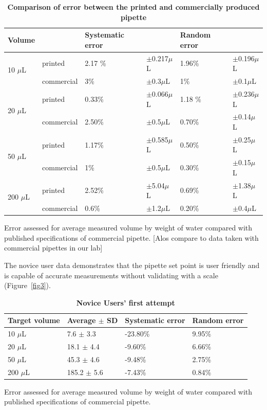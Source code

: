 \documentclass[10pt,letterpaper]{article}
\begin{document}
\begin{table}[]
\centering
\caption{
\bf{Comparison of error between the printed and commercially produced pipette}}
\begin{tabular}{llllll}
                  Volume &   & Systematic error &  & Random error & \\
                  \hline
\multirow{2}{*}{10 $\mu$L} & printed & 2.17 \% & $\pm$0.217$\mu$L  & 1.96\% & $\pm$0.196$\mu$L   \\
                  & commercial & 3\% & $\pm$0.3$\mu$L  & 1\% & $\pm$0.1$\mu$L  \\
                  \hline
\multirow{2}{*}{20 $\mu$L} & printed  & 0.33\% & $\pm$0.066$\mu$L & 1.18 \% & $\pm$0.236$\mu$L \\
                  & commercial & 2.50\% & $\pm$0.5$\mu$L & 0.70\% & $\pm$0.14$\mu$L \\
                  \hline
\multirow{2}{*}{50 $\mu$L} & printed & 1.17\% & $\pm$0.585$\mu$L & 0.50\% & $\pm$0.25$\mu$L \\
                  & commercial & 1\% & $\pm$0.5$\mu$L & 0.30\% & $\pm$0.15$\mu$L \\
                  \hline
\multirow{2}{*}{200 $\mu$L} & printed & 2.52\% & $\pm$5.04$\mu$L & 0.69\% & $\pm$1.38$\mu$L  \\
                  & commercial & 0.6\% & $\pm$1.2$\mu$L & 0.20\% & $\pm$0.4$\mu$L
\end{tabular}
\begin{flushleft} Error assessed for average measured volume by weight of water compared with published specifications of commercial pipette. [Alos compare to data taken with commercial pipettes in our lab]
\end{flushleft}
\label{table1}
\end{table}

The novice user data demonstrates that the pipette set point is user friendly and is capable of accurate measurements without validating with a scale (Figure~\ref{fig3}).

\begin{table}[]
\caption{
\bf{Novice Users' first attempt}}
\begin{tabular}{llll}
Target volume & Average $\pm$ SD & Systematic error  & Random error\\
\hline
10 $\mu$L         & 7.6 $\pm$ 3.3     & -23.80\% & 9.95\% \\
\hline
20 $\mu$L         & 18.1 $\pm$ 4.4   & -9.60\%   & 6.66\% \\
\hline
50 $\mu$L         & 45.3 $\pm$ 4.6   & -9.48\%   & 2.75\% \\
\hline
200 $\mu$L       & 185.2 $\pm$ 5.6 & -7.43\%   & 0.84\%
\end{tabular}
\begin{flushleft} Error assessed for average measured volume by weight of water compared with published specifications of commercial pipette.
\end{flushleft}
\label{table2}
\end{table}
\end{document}

